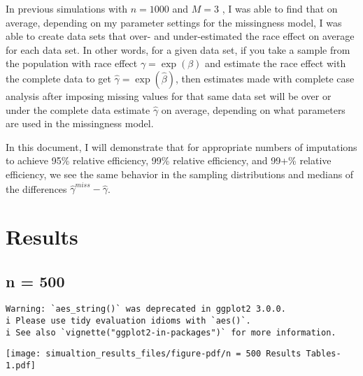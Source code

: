 \documentclass[
  letterpaper,
  DIV=11,
  numbers=noendperiod]{scrartcl}
\begin{document}
In previous simulations with \(n = 1000\) and \(M = 3\) , I was able to
find that on average, depending on my parameter settings for the
missingness model, I was able to create data sets that over- and
under-estimated the race effect on average for each data set. In other
words, for a given data set, if you take a sample from the population
with race effect \(\gamma = \exp(\beta)\) and estimate the race effect
with the complete data to get \(\hat{\gamma} = \exp(\hat{\beta})\), then
estimates made with complete case analysis after imposing missing values
for that same data set will be over or under the complete data estimate
\(\hat{\gamma}\) on average, depending on what parameters are used in
the missingness model.

In this document, I will demonstrate that for appropriate numbers of
imputations to achieve 95\% relative efficiency, 99\% relative
efficiency, and 99+\% relative efficiency, we see the same behavior in
the sampling distributions and medians of the differences
\(\hat{\gamma}^{miss} - \hat{\gamma}\).

\hypertarget{results}{%
\section{Results}\label{results}}

\hypertarget{n-500}{%
\subsection{n = 500}\label{n-500}}

\begin{verbatim}
Warning: `aes_string()` was deprecated in ggplot2 3.0.0.
i Please use tidy evaluation idioms with `aes()`.
i See also `vignette("ggplot2-in-packages")` for more information.
\end{verbatim}

\texttt{[image: simualtion\_results\_files/figure-pdf/n = 500 Results Tables-1.pdf]}
\end{document}
